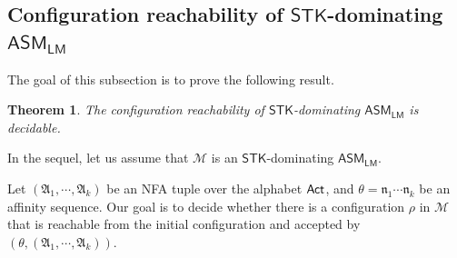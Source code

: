 \documentclass[preprint,12pt]{elsarticle}
\newtheorem{theorem}{Theorem}
\newcommand\Mm{{\mathcal{M} }}
\newcommand\act{{\sf Act}}
\newcommand\aft{{\sf Aft}}
\newcommand\lmd{{\sf Lmd}}
\newcommand\singletask{{\sf STK}}
\newcommand{\LMAMASS}{\textsf{ASM}_\textsf{LM}}
\newcommand\aname{\mathfrak{n}}
\newcommand{\STK}{\mathsf{STK}}
\newcommand{\SIT}{\mathsf{SIT}}
\newcommand{\STD}{\mathsf{STD}}
\newcommand{\STP}{\mathsf{STP}}
\newcommand\Aut{{\mathfrak{A} }}
\newcommand\ConfSet{{\mathscr{C} }}
\newcommand{\NFA}{\textsf{NFA}}
\begin{document}


\subsection{Configuration reachability of $\STK$-dominating $\LMAMASS$}

The goal of this subsection is to prove the following result. 
\begin{theorem}\label{thm-reach-lmamass}
The configuration reachability of $\STK$-dominating $\LMAMASS$ is decidable. 
\end{theorem}

In the sequel, let us assume that $\Mm$ is an $\STK$-dominating $\LMAMASS$. 
  
Let $(\Aut_1,\cdots,\Aut_k)$ be an {\NFA} tuple over the alphabet $\act$, and $\theta = \aname_1\cdots\aname_k$ be an affinity sequence. 
Our goal is to decide whether there is a configuration $\rho$ in $\Mm$ that is reachable from the initial configuration and accepted by $(\theta, (\Aut_1,\cdots,\Aut_k))$.
\end{document}
